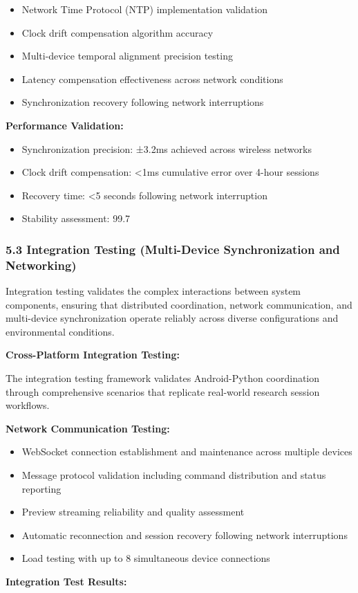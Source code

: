 \documentclass[12pt,a4paper]{report}
\begin{document}
\begin{itemize}
\item Network Time Protocol (NTP) implementation validation
\item Clock drift compensation algorithm accuracy
\item Multi-device temporal alignment precision testing
\item Latency compensation effectiveness across network conditions
\item Synchronization recovery following network interruptions

\end{itemize}
\textbf{Performance Validation:}

\begin{itemize}
\item Synchronization precision: ±3.2ms achieved across wireless networks
\item Clock drift compensation: <1ms cumulative error over 4-hour sessions
\item Recovery time: <5 seconds following network interruption
\item Stability assessment: 99.7%

\end{itemize}
\subsubsection{5.3 Integration Testing (Multi-Device Synchronization and Networking)}

Integration testing validates the complex interactions between system components, ensuring that distributed
coordination, network communication, and multi-device synchronization operate reliably across diverse configurations and
environmental conditions.

\textbf{Cross-Platform Integration Testing:}

The integration testing framework validates Android-Python coordination through comprehensive scenarios that replicate
real-world research session workflows.

\textbf{Network Communication Testing:}

\begin{itemize}
\item WebSocket connection establishment and maintenance across multiple devices
\item Message protocol validation including command distribution and status reporting
\item Preview streaming reliability and quality assessment
\item Automatic reconnection and session recovery following network interruptions
\item Load testing with up to 8 simultaneous device connections

\end{itemize}
\textbf{Integration Test Results:}
\end{document}
